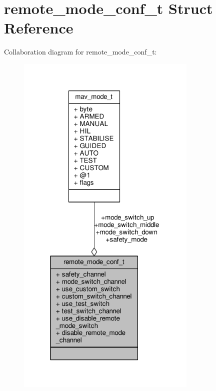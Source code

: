 \hypertarget{structremote__mode__conf__t}{\section{remote\+\_\+mode\+\_\+conf\+\_\+t Struct Reference}
\label{structremote__mode__conf__t}
}


Collaboration diagram for remote\+\_\+mode\+\_\+conf\+\_\+t\+:
\nopagebreak
\begin{figure}[H]
\begin{center}
\leavevmode
\includegraphics[width=244pt]{structremote__mode__conf__t__coll__graph}
\end{center}
\end{figure}
